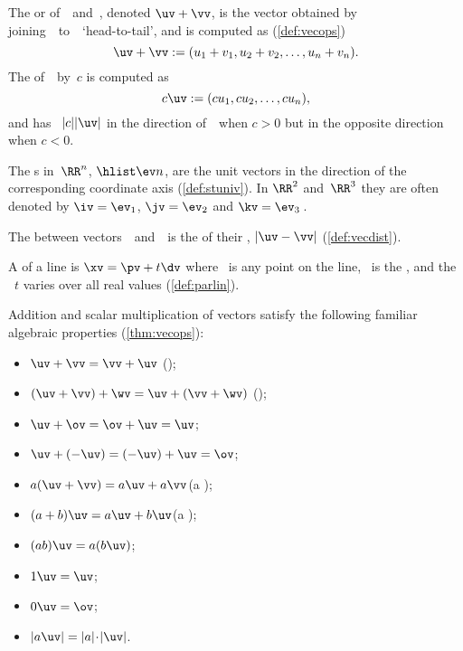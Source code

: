 \begin{itemize}
\itemme The  or  of~\uv\ and~\vv, denoted \(\uv+\vv\), is the vector obtained by joining~\vv\ to~\uv\ `head-to-tail', and is computed as (\autoref{def:vecops})
\begin{equation*}
\uv+\vv:=(u_1+v_1,u_2+v_2,\ldots,u_n+v_n).
\end{equation*}
The  of~\uv\ by~\(c\) is computed as
\begin{equation*}
c\uv:=(cu_1,cu_2,\ldots,cu_n),
\end{equation*}
and has ~\(|c||\uv|\) in the direction of~\uv\ when \(c>0\) but in the opposite direction when \(c<0\).

\itemme {}%
The s in~\(\RR^n\), \(\hlist\ev n\), are the unit vectors in the direction of the corresponding coordinate axis (\autoref{def:stuniv}).
In \(\RR^2\) and~\(\RR^3\) they are often denoted by \(\iv=\ev_1\), \(\jv=\ev_2\) and \(\kv=\ev_3\)\,.

\itemlo The  between vectors~\uv\ and~\vv\ is the  of their , \(|\uv-\vv|\) (\autoref{def:vecdist}).

\itemlo A  of a line is \(\xv=\pv+t\dv\) where \pv~is any point on the line, \dv~is the , and the  ~\(t\) varies over all real values (\autoref{def:parlin}).

\itemhi Addition and scalar multiplication of vectors satisfy the following familiar algebraic properties (\autoref{thm:vecops}):
\begin{itemize}
\item \(\uv+\vv=\vv+\uv\) \quad();
\item \((\uv+\vv)+\wv=\uv+(\vv+\wv)\) \quad();
\item \(\uv+\ov=\ov+\uv=\uv\);
\item \(\uv+(-\uv)=(-\uv)+\uv=\ov\);
\item \(a(\uv+\vv)=a\uv+a\vv\)\quad(a );
\item \((a+b)\uv=a\uv+b\uv\)\quad(a );
\item \((ab)\uv=a(b\uv)\);
\item \(1\uv=\uv\);
\item \(0\uv=\ov\);
\item \(|a\uv|=|a|\cdot|\uv|\).
\end{itemize}





\end{itemize}
